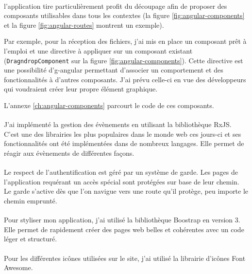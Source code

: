 \paragraph{}
l'application tire particulièrement profit du découpage afin de proposer des composants utilisables dans tous les contextes (la figure \ref{fig:angular-components} et la figure \ref{fig:angular-routes} montrent un exemple).

Par exemple, pour la réception des fichiers, j'ai mis en place un composant prêt à l'emploi et une directive à appliquer sur un composant existant (\lstinline{DragndropComponent} sur la figure \ref{fig:angular-components}).
Cette directive est une possibilité d'\Gls{g-angular} permettant d'associer un comportement et des fonctionnalités à d'autres composants.
J'ai prévu celle-ci en vue des développeurs qui voudraient créer leur propre élément graphique.

L'annexe \ref{ch:angular-components} parcourt le code de ces composants.

\paragraph{}
J'ai implémenté la gestion des évènements en utilisant la bibliothèque RxJS.
C'est une des librairies les plus populaires dans le monde web ces jours-ci et ses fonctionnalités ont été implémentées dans de nombreux langages.
Elle permet de réagir aux évènements de différentes façons.

\paragraph{}
Le respect de l'authentification est géré par un système de garde.
Les pages de l'application requérant un accès spécial sont protégées sur base de leur chemin.
Le garde s'active dès que l'on navigue vers une route qu'il protège, peu importe le chemin emprunté. 

\paragraph{}
Pour styliser mon application, j'ai utilisé la bibliothèque Boostrap en version 3.
Elle permet de rapidement créer des pages web belles et cohérentes avec un code léger et structuré.

\paragraph{}
Pour les différentes icônes utilisées sur le site, j'ai utilisé la librairie d'icônes Font Awesome.
